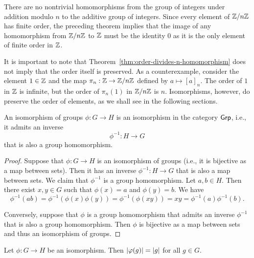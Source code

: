 \begin{example}
    There are no nontrivial homomorphisms from the group of integers under
    addition modulo \(n\) to the additive group of integers. Since every element
    of \(\mathbb{Z}/n\mathbb{Z}\) has finite order, the preceding theorem implies that the image
    of any homomorphism from \(\mathbb{Z}/n\mathbb{Z}\) to \(\mathbb{Z}\) must be the identity \(0\) as
    it is the only element of finite order in \(\mathbb{Z}\).
\end{example}

\begin{example}
    It is important to note that Theorem~\ref{thm:order-divides-n-homomorphism}
    does not imply that the order itself is preserved. As a counterexample,
    consider the element \(1 \in \mathbb{Z}\) and the map \(\pi_n : \mathbb{Z} \to \mathbb{Z}/n\mathbb{Z}\)
    defined by \(a \mapsto [a]_n\). The order of \(1\) in \(\mathbb{Z}\) is infinite,
    but the order of \(\pi_n(1)\) in \(\mathbb{Z}/n\mathbb{Z}\) is \(n\). Isomorphisms, however,
    do preserve the order of elements, as we shall see in the following
    sections.
\end{example}

\begin{theorem}
    An isomorphism of groups \(\phi: G \to H\) is an isomorphism in the category
    \(\mathsf{Grp}\), i.e., it admits an inverse
    \[
        \phi^{-1}: H \to G
    \]
    that is also a group homomorphism.
\end{theorem}

\begin{proof}
    Suppose that \(\phi: G \to H\) is an isomorphism of groups (i.e., it is
    bijective as a map between sets). Then it has an inverse \(\phi^{-1}: H \to
    G\) that is also a map between sets. We claim that \(\phi^{-1}\) is a group
    homomorphism. Let \(a, b \in H\). Then there exist \(x, y \in G\) such that
    \(\phi(x) = a\) and \(\phi(y) = b\). We have
    \[
        \phi^{-1}(ab) = \phi^{-1}(\phi(x)\phi(y)) = \phi^{-1}(\phi(xy)) = xy = \phi^{-1}(a)\phi^{-1}(b).
    \]
    
    Conversely, suppose that \(\phi\) is a group homomorphism that admits an
    inverse \(\phi^{-1}\) that is also a group homomorphism. Then \(\phi\) is
    bijective as a map between sets and thus an isomorphism of groups.
\end{proof}


\begin{theorem}
    Let \(\phi: G \to H\) be an isomorphism. Then \(\lvert \varphi(g) \rvert =
    \lvert g \rvert\) for all \(g \in G\).
\end{theorem}

